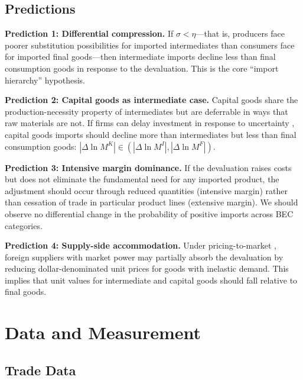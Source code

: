 \documentclass[12pt]{article}
\begin{document}
\subsection{Predictions}

\textbf{Prediction 1: Differential compression.} If $\sigma < \eta$---that is, producers face poorer substitution possibilities for imported intermediates than consumers face for imported final goods---then intermediate imports decline less than final consumption goods in response to the devaluation. This is the core ``import hierarchy'' hypothesis.

\textbf{Prediction 2: Capital goods as intermediate case.} Capital goods share the production-necessity property of intermediates but are deferrable in ways that raw materials are not. If firms can delay investment in response to uncertainty \citep{bloom2009impact}, capital goods imports should decline more than intermediates but less than final consumption goods: $|\Delta \ln M^K| \in (|\Delta \ln M^I|, |\Delta \ln M^F|)$.

\textbf{Prediction 3: Intensive margin dominance.} If the devaluation raises costs but does not eliminate the fundamental need for any imported product, the adjustment should occur through reduced quantities (intensive margin) rather than cessation of trade in particular product lines (extensive margin). We should observe no differential change in the probability of positive imports across BEC categories.

\textbf{Prediction 4: Supply-side accommodation.} Under pricing-to-market \citep{goldberg1997goods}, foreign suppliers with market power may partially absorb the devaluation by reducing dollar-denominated unit prices for goods with inelastic demand. This implies that unit values for intermediate and capital goods should fall relative to final goods.


\section{Data and Measurement}

\subsection{Trade Data}
\end{document}
